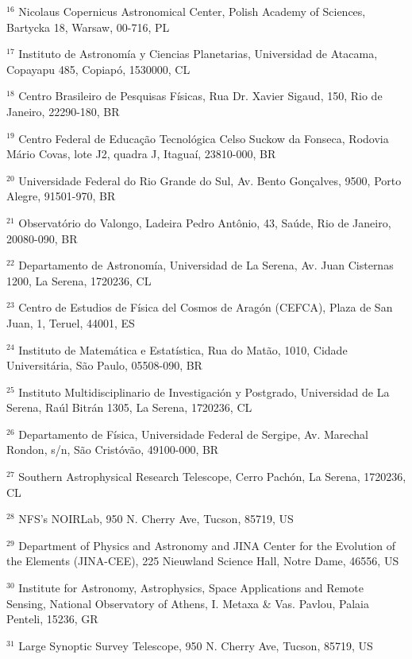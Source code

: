 \noindent
$^{16}$ Nicolaus Copernicus Astronomical Center, Polish Academy of Sciences, Bartycka 18, Warsaw, 00-716, PL

\noindent
$^{17}$ Instituto de Astronomía y Ciencias Planetarias, Universidad de Atacama, Copayapu 485, Copiapó, 1530000, CL

\noindent
$^{18}$ Centro Brasileiro de Pesquisas Físicas, Rua Dr. Xavier Sigaud, 150, Rio de Janeiro, 22290-180, BR

\noindent
$^{19}$ Centro Federal de Educação Tecnológica Celso Suckow da Fonseca, Rodovia Mário Covas, lote J2, quadra J, Itaguaí, 23810-000, BR

\noindent
$^{20}$ Universidade Federal do Rio Grande do Sul, Av. Bento Gonçalves, 9500, Porto Alegre, 91501-970, BR

\noindent
$^{21}$ Observatório do Valongo, Ladeira Pedro Antônio, 43, Saúde, Rio de Janeiro, 20080-090, BR

\noindent
$^{22}$ Departamento de Astronomía, Universidad de La Serena, Av. Juan Cisternas 1200, La Serena, 1720236, CL

\noindent
$^{23}$ Centro de Estudios de Física del Cosmos de Aragón (CEFCA), Plaza de San Juan, 1, Teruel, 44001, ES

\noindent
$^{24}$ Instituto de Matemática e Estatística, Rua do Matão, 1010, Cidade Universitária, São Paulo, 05508-090, BR

\noindent
$^{25}$ Instituto Multidisciplinario de Investigación y Postgrado, Universidad de La Serena, Raúl Bitrán 1305, La Serena, 1720236, CL

\noindent
$^{26}$ Departamento de Física, Universidade Federal de Sergipe, Av. Marechal Rondon, s/n, São Cristóvão, 49100-000, BR

\noindent
$^{27}$ Southern Astrophysical Research Telescope, Cerro Pachón, La Serena, 1720236, CL

\noindent
$^{28}$ NFS's NOIRLab, 950 N. Cherry Ave, Tucson, 85719, US

\noindent
$^{29}$ Department of Physics and Astronomy and JINA Center for the Evolution of the Elements (JINA-CEE), 225 Nieuwland Science Hall, Notre Dame, 46556, US

\noindent
$^{30}$ Institute for Astronomy, Astrophysics, Space Applications and Remote Sensing, National Observatory of Athens, I. Metaxa & Vas. Pavlou, Palaia Penteli, 15236, GR

\noindent
$^{31}$ Large Synoptic Survey Telescope, 950 N. Cherry Ave, Tucson, 85719, US
